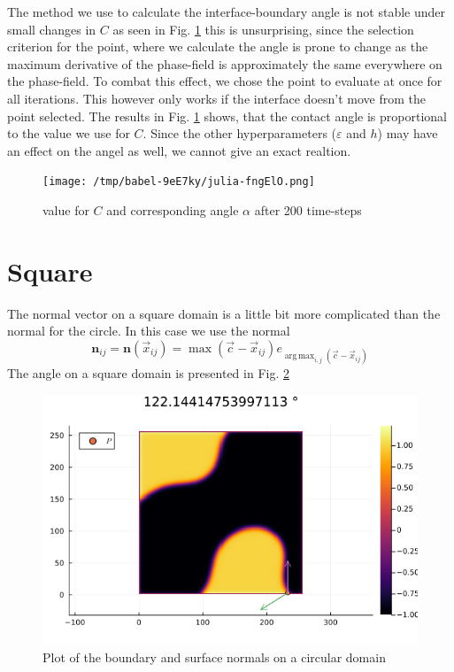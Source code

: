 \documentclass{mimosis}
\DeclareMathOperator*{\argmax}{arg\,\max}
\begin{document}
The method we use to calculate the interface-boundary angle is not stable under small changes in \(C\) as seen in  Fig. \ref{fig:angle-table} this is unsurprising, since the selection criterion for the point, where we calculate the angle is prone to change as the maximum derivative of the phase-field is approximately the same everywhere on the phase-field. To combat this effect, we chose the point to evaluate at once for all iterations. This however only works if the interface doesn't move from the point selected. The results in Fig. \ref{fig:angle-table} shows, that the contact angle is proportional to the value we use for \(C\). Since the other hyperparameters (\(\varepsilon\) and \(h\)) may have an effect on the angel as well, we cannot give an exact realtion.

\begin{figure}[htbp]
\centering
\texttt{[image: /tmp/babel-9eE7ky/julia-fngElO.png]}
\caption{\label{fig:angle-table}value for \(C\) and corresponding angle \(\alpha\) after 200 time-steps}
\end{figure}
\section{Square}
\label{sec:orge6cf74e}
The normal vector on a square domain is a little bit more complicated than the normal for the circle. In this case we use the normal
\begin{equation}
\label{eq:9}
\mathbf{n}_{ij} = \mathbf{n}(\vec{x}_{ij}) = \max(\vec{c} - \vec{x}_{ij}) e_{\argmax_{i,j}(\vec{c} - \vec{x}_{ij})}
\end{equation}
The angle on a square domain is presented in Fig. \ref{fig:angle-on-square}
\begin{figure}[htbp]
\centering
\includegraphics[width=.9\linewidth]{images/angle-square.png}
\caption{\label{fig:angle-on-square}Plot of the boundary and surface normals on a circular domain}
\end{figure}
\end{document}

